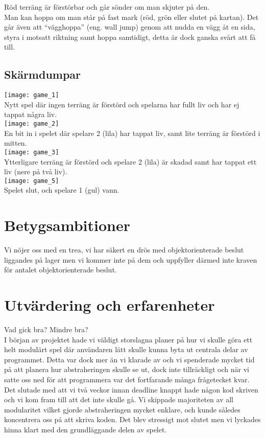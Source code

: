 \vspace{11pt}
Röd terräng är förstörbar och går sönder om man skjuter på den.\\
\vspace{11pt}
Man kan hoppa om man står på fast mark (röd, grön eller slutet på kartan). Det går även att ``vägghoppa'' (eng. wall jump) genom att nudda en vägg åt en sida, styra i motsatt riktning samt hoppa samtidigt, detta är dock ganska svårt att få till.\\
\vspace{11pt}
\subsection{Skärmdumpar}
\texttt{[image: game\_1]}\\
Nytt spel där ingen terräng är förstörd och spelarna har fullt liv och har ej tappat några liv.\\
\texttt{[image: game\_2]}\\
En bit in i spelet där spelare 2 (lila) har tappat liv, samt lite terräng är förstörd i mitten.\\
\texttt{[image: game\_3]}\\
Ytterligare terräng är förstörd och spelare 2 (lila) är skadad samt har tappat ett liv (nere på två liv).\\
\texttt{[image: game\_5]}\\
Spelet slut, och spelare 1 (gul) vann.\\
\section{Betygsambitioner}
Vi nöjer oss med en trea, vi har säkert en drös med objektorienterade beslut liggandes på lager men vi kommer inte på dem och uppfyller därmed inte kraven för antalet objektorienterade beslut.
\section{Utvärdering och erfarenheter}
{\color{red}
Vad gick bra? Mindre bra?\\}
I början av projektet hade vi väldigt storslagna planer på hur vi skulle göra ett helt modulärt spel där användaren lätt skulle kunna byta ut centrala delar av programmet. Detta var dock mer än vi klarade av och vi spenderade mycket tid på att planera hur abstraheringen skulle se ut, dock inte tillräckligt och när vi satte oss ned för att programmera var det fortfarande många frågetecket kvar. Det slutade med att vi två veckor innan deadline knappt hade någon kod skriven och vi kom fram till att det inte skulle gå. Vi skippade majoriteten av all modularitet vilket gjorde abstraheringen mycket enklare, och kunde således koncentrera oss på att skriva koden. Det blev stressigt mot slutet men vi lyckades hinna klart med den grundläggande delen av spelet. \\

